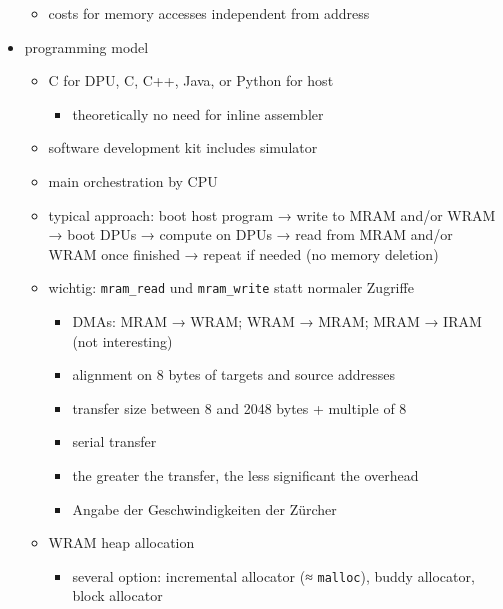 \begin{itemize}
\begin{itemize}
		\item
		costs for memory accesses independent from address
	\end{itemize}

	\item
	programming model
	\begin{itemize}
		\item
		C for DPU, C, C++, Java, or Python for host
		\begin{itemize}
			\item
			theoretically no need for inline assembler
		\end{itemize}

		\item
		software development kit includes simulator

		\item
		main orchestration by CPU

		\item
		typical approach:
		boot host program → write to MRAM and/or WRAM → boot DPUs → compute on DPUs → read from MRAM and/or WRAM once finished → repeat if needed (no memory deletion)

		\item
		wichtig:
		\lstinline|mram_read| und \lstinline|mram_write| statt normaler Zugriffe
		\begin{itemize}
			\item
			DMAs:
			MRAM → WRAM;
			WRAM → MRAM;
			MRAM → IRAM (not interesting)

			\item
			alignment on 8 bytes of targets and source addresses

			\item
			transfer size between 8 and 2048 bytes + multiple of 8

			\item
			serial transfer

			\item
			the greater the transfer, the less significant the overhead

			\item
			Angabe der Geschwindigkeiten der Zürcher
		\end{itemize}

		\item
		WRAM heap allocation
		\begin{itemize}
			\item
			several option:
			incremental allocator (≈ \lstinline|malloc|), buddy allocator, block allocator


\end{itemize}
\end{itemize}
\end{itemize}
